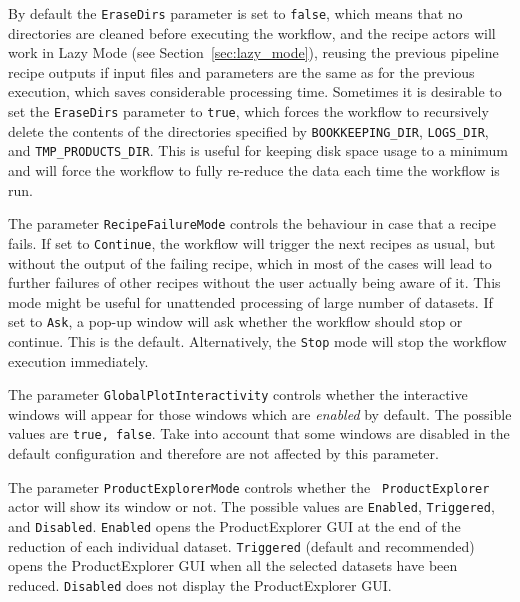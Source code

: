 By default the {\tt EraseDirs} parameter is set to {\tt false}, which
means that no directories are cleaned before executing the workflow,
and the recipe actors will work in Lazy Mode (see
Section~\ref{sec:lazy_mode}), reusing the previous pipeline recipe outputs
if input files and parameters are the same as for the previous
execution, which saves considerable processing time. Sometimes it is
desirable to set the {\tt EraseDirs} parameter to {\tt true}, which
forces the workflow to recursively delete the contents of the
directories specified by {\tt BOOKKEEPING\_DIR}, {\tt LOGS\_DIR}, and
{\tt TMP\_PRODUCTS\_DIR}. This is useful for keeping disk space usage
to a minimum and will force the workflow to fully re-reduce the data
each time the workflow is run.

The parameter {\tt RecipeFailureMode} controls the behaviour in case that
a recipe fails. If set to {\tt Continue}, the workflow will trigger the next
recipes as usual, but without the output of the failing recipe, which in most
of the cases will lead to further failures of other recipes without the user
actually being aware of it. This mode might be useful for unattended processing
of large number of datasets. If set to {\tt Ask}, a pop-up window will ask
whether the workflow should stop or continue. This is the default. 
Alternatively, the {\tt Stop} mode will stop the workflow execution immediately.


\ifx{}\undefined
\else
The parameter {\tt GlobalPlotInteractivity} controls whether the interactive
windows will appear for those windows which are {\sl enabled} by default.
The possible values are {\tt true, false}.
Take into account that some windows are disabled in the default configuration
and therefore are not affected by this parameter.
\fi

The parameter {\tt ProductExplorerMode} controls whether the {\tt
  ProductExplorer} actor will show its window or not.  The possible
values are {\tt Enabled},   {\tt Triggered}, and {\tt Disabled}.
{\tt Enabled} opens the ProductExplorer GUI at the end of the reduction of
each individual dataset. {\tt Triggered} (default and recommended) opens
the ProductExplorer GUI when all the selected datasets have been
reduced. {\tt Disabled} does not display the ProductExplorer GUI.

